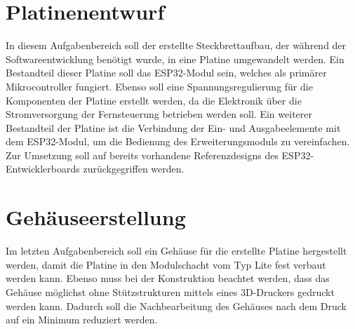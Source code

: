 \section{Platinenentwurf}
\label{section:pcbRequirement}
In diesem Aufgabenbereich soll der erstellte Steckbrettaufbau, der während der Softwareentwicklung benötigt wurde, in eine Platine umgewandelt werden. Ein Bestandteil dieser Platine soll das ESP32-Modul sein, welches als primärer Mikrocontroller fungiert. Ebenso soll eine Spannungsregulierung für die Komponenten der Platine erstellt werden, da die Elektronik über die Stromversorgung der Fernsteuerung betrieben werden soll. Ein weiterer Bestandteil der Platine ist die Verbindung der Ein- und Ausgabeelemente mit dem ESP32-Modul, um die Bedienung des Erweiterungsmoduls zu vereinfachen. Zur Umsetzung soll auf bereits vorhandene Referenzdesigns des ESP32-Entwicklerboards zurückgegriffen werden.

\section{Gehäuseerstellung}
\label{section:caseRequirement}
Im letzten Aufgabenbereich soll ein Gehäuse für die erstellte Platine hergestellt werden, damit die Platine in den Modulschacht vom Typ Lite fest verbaut werden kann. Ebenso muss bei der Konstruktion beachtet werden, dass das Gehäuse möglichst ohne Stützstrukturen mittels eines 3D-Druckers gedruckt werden kann. Dadurch soll die Nachbearbeitung des Gehäuses nach dem Druck auf ein Minimum reduziert werden.